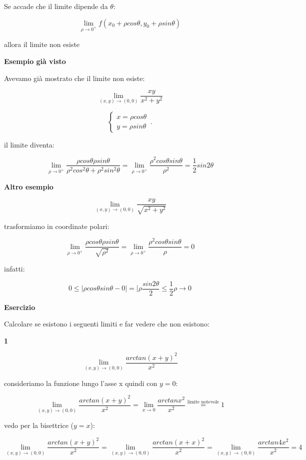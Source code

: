 \documentclass[11pt]{article}
\begin{document}
Se accade che il limite dipende da $\theta$:

\[
       \lim_{ \rho \to 0^{+} }  f(x_0+\rho cos\theta, y_0+\rho sin \theta )
\]

allora il limite non esiste


\textbf{Esempio già visto} 

Avevamo già mostrato che il limite non esiste:

\[
\lim_{ (x,y) \to (0,0) } \frac{xy}{x^{2}+y^{2}}
\]

\begin{equation}
    \begin{cases}
           x=\rho cos \theta\\
           y = \rho sin \theta
    \end{cases}\,.
\end{equation}

il limite diventa:

\[
    \lim_{ \rho \to 0^{+} } \frac{\rho cos\theta \rho sin \theta}{\rho ^{2} cos^{2}\theta + \rho ^{2}sin ^{2}\theta}  = \lim_{ \rho \to 0^{+} } \frac{\rho^{2} cos\theta sin \theta}{\rho^{2}}  = \frac{1}{2} sin 2\theta
\]


\textbf{Altro esempio} 

\[
    \lim_{ (x,y) \to (0,0) } \frac{xy}{\sqrt{x^{2}+y^{2}}}
\]

trasformiamo in coordinate polari:

\[
    \lim_{ \rho \to 0^{+} } \frac{\rho cos\theta \rho sin \theta}{\sqrt{\rho^{2}}} = \lim_{ \rho \to 0^{+} } \frac{\rho ^{2} cos\theta sin \theta}{\rho}=0
\]

infatti:

\[
    0 \le |\rho cos\theta sin \theta -0| = |\rho \frac{sin2\theta}{2} \le \frac{1}{2}\rho \rightarrow 0
\]

\textbf{Esercizio} 

Calcolare se esistono i seguenti limiti e far vedere che non esistono:

\textbf{1} 

\[
    \lim_{ (x,y) \to (0,0) } \frac{arctan(x+y)^{2}}{x^{2}}  
\]

consideriamo la funzione lungo l'asse x quindi con $y=0$:

\[
    \lim_{ (x,y) \to (0,0) } \frac{arctan(x+y)^{2}}{x^{2}}= \lim_{ x \to 0 }  \frac{arctan x^{2} }{x^{2}} \overset{\text{limite notevole}}{=} 1
\]

vedo per la bisettrice ($y=x$):

\[
     \lim_{ (x,y) \to (0,0) } \frac{arctan(x+y)^{2}}{x^{2}} =  \lim_{ (x,y) \to (0,0) } \frac{arctan(x+x)^{2}}{x^{2}} =  \lim_{ (x,y) \to (0,0) } \frac{arctan 4x^{2}}{x^{2}} = 4
\]
\end{document}
